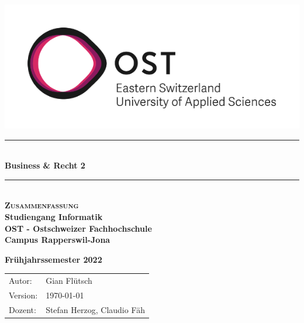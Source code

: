 


\begin{titlepage}


   \newcommand{\HRule}{\color{black}\rule{\linewidth}{0.5mm}} %
   
   \center
   
   \begin{minipage}{0.49\linewidth}
         \vspace{2pt}
        \hfill
   \end{minipage}
   \begin{minipage}{0.49\linewidth}
      \hfill
      \includegraphics[width=0.6\linewidth]{img/OST_Logo}
   \end{minipage}

   \vspace*{\fill}

   \vspace{1.5cm}

   {\HRule} \\[0.7cm]
   {\huge \bfseries Business \& Recht 2}\\[0.4cm]
   
   {\HRule} \\[1.5cm]
   
   \textbf{\textsc{\Huge Zusammenfassung}}\\[1.5cm]
   
   \Large
   \textbf{Studiengang Informatik}\\
   \textbf{OST - Ostschweizer Fachhochschule}\\
   \textbf{Campus Rapperswil-Jona}\\
   
   \vspace{1cm}
   
   \textbf{Frühjahrssemester 2022}\\
   
   \vspace{1.5cm}

   \begin{center}
      \begin{tabular} {|p{3cm} p{6cm}|}
         Autor:          &     Gian Flütsch     \\
         Version:          &     \today         \\
         Dozent:         &     Stefan Herzog, Claudio Fäh    \\
      \end{tabular}
   \end{center}



   \vfill %

\end{titlepage}


\setcounter{tocdepth}{1}


